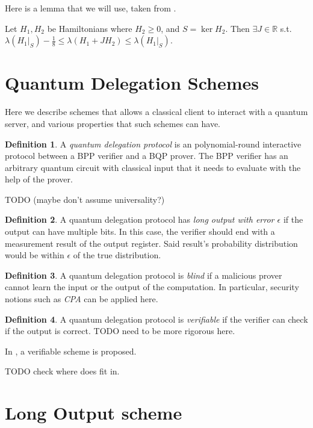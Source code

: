 \documentclass{article}
\theoremstyle{definition}
\newtheorem{definition}{Definition}[section]
\begin{document}
Here is a lemma that we will use, taken from \cite{quant-ph/0406180}.

Let $H_1, H_2$ be Hamiltonians where $H_2\geq0$, and $S=\ker H_2$.
Then $\exists J\in\mathbb{R}$ s.t.
$\lambda(H_1\big|_S)-\frac{1}{8}\leq
	\lambda(H_1+JH_2)\leq\lambda(H_1\big|_S)$.

\section{Quantum Delegation Schemes}

Here we describe schemes that allows a classical client to interact with a quantum server, and various properties that such schemes can have.

\begin{definition}
	A \emph{quantum delegation protocol} is an polynomial-round interactive protocol between a BPP verifier and a BQP prover. The BPP verifier has an arbitrary quantum circuit with classical input that it needs to evaluate with the help of the prover.
\end{definition}

TODO (maybe don't assume universality?)

\begin{definition}
	A quantum delegation protocol has \emph{long output with error $\epsilon$} if the output can have multiple bits. In this case, the verifier should end with a measurement result of the output register. Said result's probability distribution would be within $\epsilon$ of the true distribution.
\end{definition}

\begin{definition}
	A quantum delegation protocol is \emph{blind} if a malicious prover cannot learn the input or the output of the computation. In particular, security notions such as \emph{CPA} can be applied here.
\end{definition}

\begin{definition}
	A quantum delegation protocol is \emph{verifiable} if the verifier can check if the output is correct. TODO need to be more rigorous here.
\end{definition}

In \cite{1804.01082}, a verifiable scheme is proposed.

TODO check where does \cite{arXiv:1904.06320} fit in.

\section{Long Output scheme}
\end{document}
